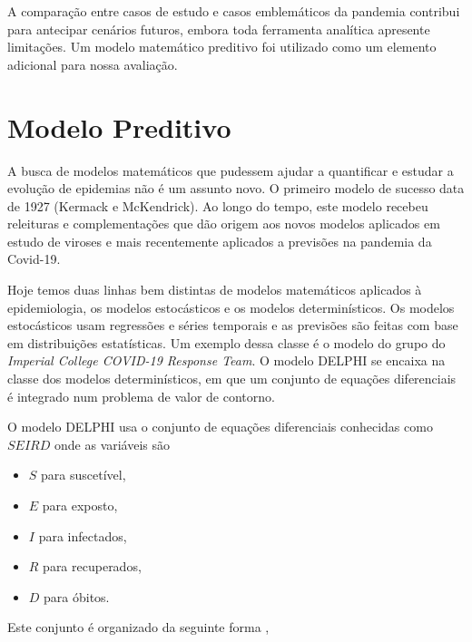 \documentclass[12pt]{article}
\begin{document}
A comparação entre casos de estudo e casos emblemáticos da pandemia contribui para antecipar cenários futuros, embora toda ferramenta analítica apresente limitações. Um modelo matemático preditivo foi utilizado como um elemento adicional para nossa avaliação.

\section{Modelo Preditivo}

A busca de modelos matemáticos que pudessem ajudar a quantificar e estudar a evolução de epidemias não é um assunto novo. O primeiro modelo de sucesso data de 1927 (Kermack e McKendrick)\cite{doi:10.1098/rspa.1927.0118}. Ao longo do tempo, este modelo recebeu releituras e complementações que dão origem aos novos modelos aplicados em estudo de viroses e mais recentemente aplicados a previsões na pandemia da Covid-19. 

Hoje temos duas linhas bem distintas de modelos matemáticos aplicados à epidemiologia, os modelos estocásticos e os modelos determinísticos. Os modelos estocásticos usam regressões e séries temporais e as previsões são feitas com base em distribuições estatísticas. Um exemplo dessa classe é o modelo do grupo do \textit{Imperial College COVID-19 Response Team}\cite{impirial1}. O modelo DELPHI\cite{delphi} se encaixa na classe dos modelos determinísticos, em que um conjunto de equações diferenciais é integrado num problema de valor de contorno\cite{2008elementary}. 

O modelo DELPHI usa o conjunto de equações diferenciais conhecidas como $SEIRD$ onde as variáveis  são 
\begin{itemize}
\item $S$ para suscetível,
\item $E$ para exposto,
\item $I$ para infectados,
\item $R$ para recuperados,
\item $D$ para óbitos.
\end{itemize}
Este conjunto é organizado da seguinte forma ,
\end{document}
